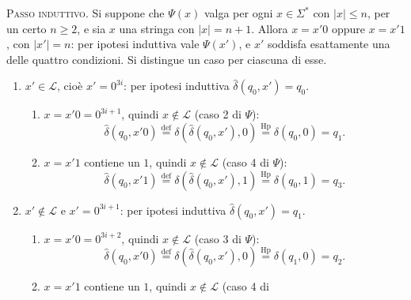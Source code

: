 \documentclass[a4paper, 11pt, oneside]{book}
\theoremstyle{formale}
\begin{document}
    \textsc{Passo induttivo}. Si suppone che $\Psi(x)$ valga per ogni $x \in \Sigma^*$ con
    $|x| \leq n$, per un certo $n \geq 2$, e sia $x$ una stringa con $|x| = n + 1$. Allora
    $x = x'0$ oppure $x = x'1$, con $|x'| = n$: per ipotesi induttiva vale $\Psi(x')$, e
    $x'$ soddisfa esattamente una delle quattro condizioni. Si distingue un caso per
    ciascuna di esse.
    \begin{enumerate}
        \item $x' \in \mathcal{L}$, cio\`e $x' = 0^{3i}$: per ipotesi induttiva
            $\hat{\delta}(q_0, x') = q_0$.
            \begin{enumerate}[label=\arabic{enumi}\alph*.]
                \item $x = x'0 = 0^{3i+1}$, quindi $x \notin \mathcal{L}$ (caso 2 di
                    $\Psi$):
                    \begin{equation*}
                        \hat{\delta}(q_0, x'0)
                        \overset{\text{def}}{=} \delta(\hat{\delta}(q_0, x'), 0)
                        \overset{\text{Hp}}{=} \delta(q_0, 0) = q_1.
                    \end{equation*}
                \item $x = x'1$ contiene un $1$, quindi $x \notin \mathcal{L}$ (caso 4 di
                    $\Psi$):
                    \begin{equation*}
                        \hat{\delta}(q_0, x'1)
                        \overset{\text{def}}{=} \delta(\hat{\delta}(q_0, x'), 1)
                        \overset{\text{Hp}}{=} \delta(q_0, 1) = q_3.
                    \end{equation*}
            \end{enumerate}
        \item $x' \notin \mathcal{L}$ e $x' = 0^{3i+1}$: per ipotesi induttiva
            $\hat{\delta}(q_0, x') = q_1$.
            \begin{enumerate}[label=\arabic{enumi}\alph*.]
                \item $x = x'0 = 0^{3i+2}$, quindi $x \notin \mathcal{L}$ (caso 3 di
                    $\Psi$):
                    \begin{equation*}
                        \hat{\delta}(q_0, x'0)
                        \overset{\text{def}}{=} \delta(\hat{\delta}(q_0, x'), 0)
                        \overset{\text{Hp}}{=} \delta(q_1, 0) = q_2.
                    \end{equation*}
                \item $x = x'1$ contiene un $1$, quindi $x \notin \mathcal{L}$ (caso 4 di

\end{enumerate}
\end{enumerate}
\end{document}
